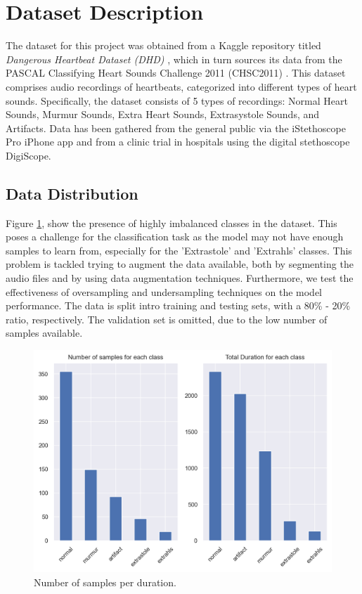 \section{Dataset Description}

The dataset for this project was obtained from a Kaggle repository titled \textit{Dangerous Heartbeat Dataset (DHD)} \cite{Dangerous-Heartbeat-Dataset-DHD}, 
which in turn sources its data from the PASCAL Classifying Heart Sounds Challenge 2011 (CHSC2011) \cite{pascal-chsc-2011}. 
This dataset comprises audio recordings of heartbeats, categorized into different types of heart sounds.
Specifically, the dataset consists of 5 types of recordings: Normal Heart Sounds, Murmur Sounds, Extra Heart Sounds, Extrasystole Sounds, and Artifacts.
Data has been gathered from the general public via the iStethoscope Pro iPhone app and from a clinic trial in hospitals using the digital stethoscope DigiScope.

\subsection{Data Distribution}
Figure \ref{fig:DataExp_num_durations}, show the presence of highly imbalanced classes in the dataset.
This poses a challenge for the classification task as the model may not have enough samples to learn from,
especially for the 'Extrastole' and 'Extrahls' classes. This problem is tackled trying to augment the data available,
both by segmenting the audio files and by using data augmentation techniques. Furthermore, 
we test the effectiveness of oversampling and undersampling techniques on the model performance.
The data is split intro training and testing sets, with a 80\% - 20\% ratio, respectively. The validation set
is omitted, due to the low number of samples available.

\begin{figure}[H]
    \centering
    \includegraphics[width=1\columnwidth]{./images/DataExp_num_durations.png}
    \caption{Number of samples per duration.}
    \label{fig:DataExp_num_durations}
\end{figure}



